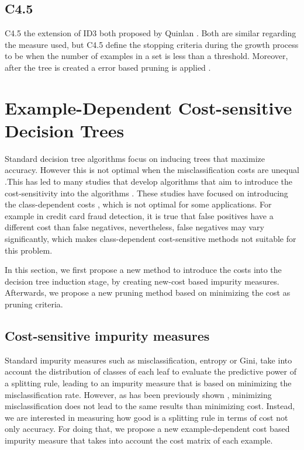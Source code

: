 {{  \subsection{C4.5}
  C4.5 the extension of ID3 both proposed by Quinlan \citep{Quinlan1992}.
  Both are similar regarding the measure used, but C4.5 define the stopping criteria during the 
growth process
  to be when the number of examples in a set is less than a threshold. Moreover, after the tree is 
created
  a error based pruning is applied \citep{Rokach2010}.
 


\section{Example-Dependent Cost-sensitive Decision Trees}

Standard decision tree algorithms focus on inducing trees that maximize accuracy. However this is 
	not optimal when the misclassification costs are unequal \citep{Elkan2001}.This has led to many 
	studies that develop algorithms that aim to introduce the cost-sensitivity into the algorithms 
	\citep{Lomax2013}. These studies have focused on introducing the class-dependent costs  
	\citep{Draper1994,Ting2002,Ling2004,Li2005,Kretowski2006,Vadera2010}, which is not optimal for 
	some applications. For example in credit card fraud detection, it is true that false positives 
	have a different cost than false negatives, nevertheless, false negatives may vary significantly, 
	which makes class-dependent cost-sensitive methods not suitable for this problem.
      
  In this section, we first propose a new method to introduce the costs into the decision tree 
	induction stage, by creating new-cost based impurity measures. Afterwards, we propose a new 
	pruning method based on minimizing the cost as pruning criteria.

	\subsection{Cost-sensitive impurity measures}

		Standard impurity measures such as misclassification, entropy or Gini, take into account the 
		distribution of classes of each leaf to evaluate the predictive power of a splitting rule,
		leading to an impurity measure that is based on minimizing the misclassification rate. However, 
		as has been previously shown \citep{CorreaBahnsen2013}, minimizing misclassification does not 
		lead to the same results than minimizing cost. Instead, we are interested in measuring how good 
		is a splitting rule in terms of cost not only accuracy. For doing that, we propose a new 
		example-dependent cost based impurity measure that takes into account the cost matrix of each 
		example.

}}
